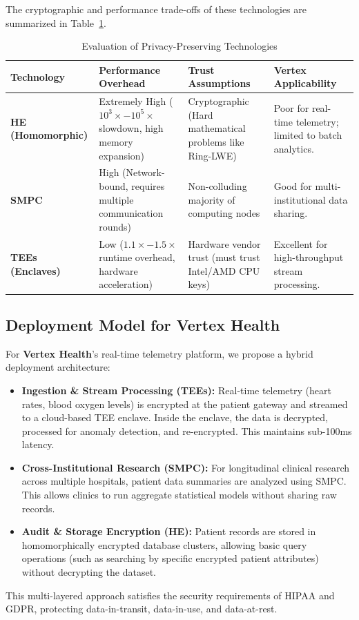 The cryptographic and performance trade-offs of these technologies are summarized in Table~\ref{tab:privacy_comparison}.

\begin{table}[h]
  \centering
  \caption{Evaluation of Privacy-Preserving Technologies}
  \label{tab:privacy_comparison}
  \medskip
  \begin{tabularx}{\textwidth}{l X X X}
    \toprule
    \textbf{Technology} & \textbf{Performance Overhead} & \textbf{Trust Assumptions} & \textbf{Vertex Applicability} \\
    \midrule
    \textbf{HE (Homomorphic)} & Extremely High ($10^3\times - 10^5\times$ slowdown, high memory expansion) & Cryptographic (Hard mathematical problems like Ring-LWE) & Poor for real-time telemetry; limited to batch analytics. \\
    \textbf{SMPC} & High (Network-bound, requires multiple communication rounds) & Non-colluding majority of computing nodes & Good for multi-institutional data sharing. \\
    \textbf{TEEs (Enclaves)} & Low ($1.1\times - 1.5\times$ runtime overhead, hardware acceleration) & Hardware vendor trust (must trust Intel/AMD CPU keys) & Excellent for high-throughput stream processing. \\
    \bottomrule
  \end{tabularx}
\end{table}

\subsection{Deployment Model for Vertex Health}

For \textbf{Vertex Health}'s real-time telemetry platform, we propose a hybrid deployment architecture:
\begin{itemize}
  \item \textbf{Ingestion \& Stream Processing (TEEs):} Real-time telemetry (heart rates, blood oxygen levels) is encrypted at the patient gateway and streamed to a cloud-based TEE enclave. Inside the enclave, the data is decrypted, processed for anomaly detection, and re-encrypted. This maintains sub-100ms latency.
  \item \textbf{Cross-Institutional Research (SMPC):} For longitudinal clinical research across multiple hospitals, patient data summaries are analyzed using SMPC. This allows clinics to run aggregate statistical models without sharing raw records.
  \item \textbf{Audit \& Storage Encryption (HE):} Patient records are stored in homomorphically encrypted database clusters, allowing basic query operations (such as searching by specific encrypted patient attributes) without decrypting the dataset.
\end{itemize}
This multi-layered approach satisfies the security requirements of HIPAA and GDPR, protecting data-in-transit, data-in-use, and data-at-rest.
